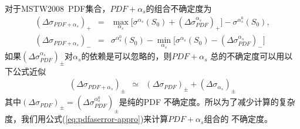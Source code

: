 对于MSTW2008~PDF集合，$PDF+\alpha_s$的组合不确定度为\cite{mstw2008:method}
\begin{eqnarray}
\label{eq:pdfaserror-mstw}
\left( \Delta \sigma_{PDF+\alpha_s} \right)_{+}
&=&
\max_{\alpha_s}
\Big[
\sigma^{\alpha_s}(S_0) + \left( \Delta \sigma^{\alpha_s}_{PDF} \right)_{+}
\Big]
- \sigma^{\alpha_s^0}(S_0), \nonumber \\
\left( \Delta \sigma_{PDF+\alpha_s} \right)_{-}
&=&
\sigma^{\alpha_s^0}(S_0) -
\min_{\alpha_s}
\Big[
\sigma^{\alpha_s}(S_0) - \left( \Delta \sigma^{\alpha_s}_{PDF} \right)_{-}
\Big]
\end{eqnarray}
如果$\left( \Delta \sigma^{\alpha_s}_{PDF}\right)_{\pm}$对$\alpha_s$的依赖是可以忽略的，则$PDF+\alpha_s$
总的不确定度可以用以下公式近似
\begin{eqnarray}
\left( \Delta \sigma_{PDF+\alpha_s} \right)_{\pm}
&\simeq&
\left( \Delta \sigma_{PDF} \right)_{\pm} +
\left( \Delta \sigma_{\alpha_s} \right)_{\pm}
\label{eq:pdfaserror-appro}
\end{eqnarray}
其中$\left( \Delta \sigma_{PDF} \right)_{\pm} = (\Delta \sigma^{\alpha_s^0}_{PDF})_{\pm}$是纯的PDF
不确定度。所以为了减少计算的复杂度，我们用公式(\ref{eq:pdfaserror-appro})来计算$PDF+\alpha_s$组合的
不确定度。


